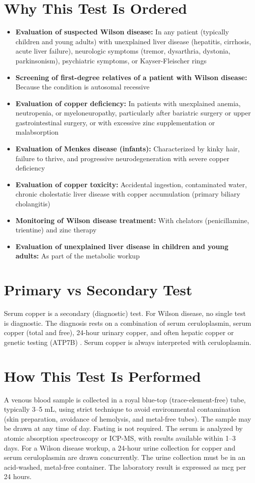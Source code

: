 \section*{Why This Test Is Ordered}
\begin{itemize}
  \item \textbf{Evaluation of suspected Wilson disease:} In any patient (typically children and young adults) with unexplained liver disease (hepatitis, cirrhosis, acute liver failure), neurologic symptoms (tremor, dysarthria, dystonia, parkinsonism), psychiatric symptoms, or Kayser-Fleischer rings
  \item \textbf{Screening of first-degree relatives of a patient with Wilson disease:} Because the condition is autosomal recessive
  \item \textbf{Evaluation of copper deficiency:} In patients with unexplained anemia, neutropenia, or myeloneuropathy, particularly after bariatric surgery or upper gastrointestinal surgery, or with excessive zinc supplementation or malabsorption
  \item \textbf{Evaluation of Menkes disease (infants):} Characterized by kinky hair, failure to thrive, and progressive neurodegeneration with severe copper deficiency
  \item \textbf{Evaluation of copper toxicity:} Accidental ingestion, contaminated water, chronic cholestatic liver disease with copper accumulation (primary biliary cholangitis)
  \item \textbf{Monitoring of Wilson disease treatment:} With chelators (penicillamine, trientine) and zinc therapy
  \item \textbf{Evaluation of unexplained liver disease in children and young adults:} As part of the metabolic workup
\end{itemize}

\section*{Primary vs Secondary Test}
Serum copper is a secondary (diagnostic) test. For Wilson disease, no single test is diagnostic. The diagnosis rests on a combination of serum ceruloplasmin, serum copper (total and free), 24-hour urinary copper, and often hepatic copper or genetic testing (ATP7B) \cite{schilsky2023multidisciplinary,roberts2008diagnosis}. Serum copper is always interpreted with ceruloplasmin.

\section*{How This Test Is Performed}
A venous blood sample is collected in a royal blue-top (trace-element-free) tube, typically 3--5 mL, using strict technique to avoid environmental contamination (skin preparation, avoidance of hemolysis, and metal-free tubes). The sample may be drawn at any time of day. Fasting is not required. The serum is analyzed by atomic absorption spectroscopy or ICP-MS, with results available within 1--3 days. For a Wilson disease workup, a 24-hour urine collection for copper and serum ceruloplasmin are drawn concurrently. The urine collection must be in an acid-washed, metal-free container. The laboratory result is expressed as mcg per 24 hours.

